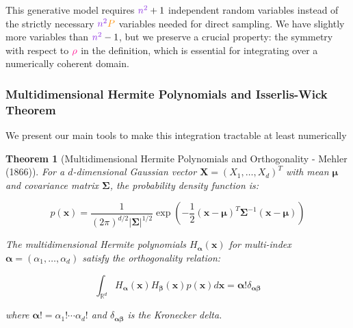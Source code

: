 \documentclass[a4paper]{article}
\theoremstyle{plain}
\newtheorem{theorem}{Theorem}[section]
\theoremstyle{definition}
\theoremstyle{remark}
\begin{document}
\begin{tcolorbox}[colback=green!5,colframe=green!80!black,title={\textbf{Remark: Generative Model}},enhanced,drop shadow,boxrule=2pt]
This generative model requires $\textcolor{methodcolor}{n^2} + 1$ independent random variables instead of the strictly necessary $\textcolor{methodcolor}{n^2}\textcolor{insightcolor}{P}$ variables needed for direct sampling. We have slightly more variables than $\textcolor{methodcolor}{n^2} - 1$, but we preserve a crucial property: the symmetry with respect to $\textcolor{breakthroughcolor}{\rho}$ in the definition, which is essential for integrating over a numerically coherent domain.
\end{tcolorbox}


\subsubsection{Multidimensional Hermite Polynomials and Isserlis-Wick Theorem}

We present our main tools to make this integration tractable at least numerically

\begin{theorem}[Multidimensional Hermite Polynomials and Orthogonality - Mehler (1866)]
\label{thm:multidim_hermite}
For a $d$-dimensional Gaussian vector $\mathbf{X} = (X_1, \ldots, X_d)^T$ with mean $\boldsymbol{\mu}$ and covariance matrix $\boldsymbol{\Sigma}$, the probability density function is:

\begin{equation}
\boxed{p(\mathbf{x}) = \frac{1}{(2\pi)^{d/2}|\boldsymbol{\Sigma}|^{1/2}} \exp\left(-\frac{1}{2}(\mathbf{x}-\boldsymbol{\mu})^T\boldsymbol{\Sigma}^{-1}(\mathbf{x}-\boldsymbol{\mu})\right)} \label{eq:multivariate_gaussian_pdf}
\end{equation}

The multidimensional Hermite polynomials $H_{\boldsymbol{\alpha}}(\mathbf{x})$ for multi-index $\boldsymbol{\alpha} = (\alpha_1, \ldots, \alpha_d)$ satisfy the orthogonality relation:

\begin{equation}
\boxed{\int_{\mathbb{R}^d} H_{\boldsymbol{\alpha}}(\mathbf{x}) H_{\boldsymbol{\beta}}(\mathbf{x}) p(\mathbf{x}) d\mathbf{x} = \boldsymbol{\alpha}! \delta_{\boldsymbol{\alpha}\boldsymbol{\beta}}} \label{eq:orthogonality_multidim}
\end{equation}

where $\boldsymbol{\alpha}! = \alpha_1! \cdots \alpha_d!$ and $\delta_{\boldsymbol{\alpha}\boldsymbol{\beta}}$ is the Kronecker delta.
\end{theorem}
\end{document}
